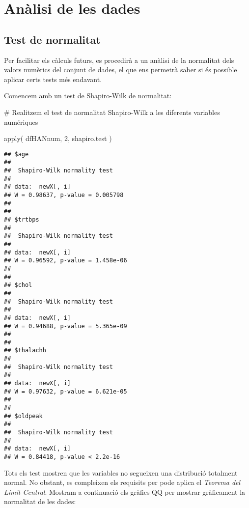 \documentclass[
]{article}
\newenvironment{Shaded}{\begin{snugshade}}{\end{snugshade}}
\newcommand{\CommentTok}[1]{\textcolor[rgb]{0.50,0.62,0.50}{#1}}
\newcommand{\DecValTok}[1]{\textcolor[rgb]{0.86,0.86,0.80}{#1}}
\newcommand{\FunctionTok}[1]{\textcolor[rgb]{0.94,0.94,0.56}{#1}}
\newcommand{\NormalTok}[1]{\textcolor[rgb]{0.80,0.80,0.80}{#1}}
\begin{document}
\hypertarget{anuxe0lisi-de-les-dades}{%
\section{Anàlisi de les dades}\label{anuxe0lisi-de-les-dades}}

\hypertarget{test-de-normalitat}{%
\subsection{Test de normalitat}\label{test-de-normalitat}}

Per facilitar els càlculs futurs, es procedirà a un anàlisi de la
normalitat dels valors numèrics del conjunt de dades, el que ens
permetrà saber si és possible aplicar certs tests més endavant.

Comencem amb un test de Shapiro-Wilk de normalitat:

\begin{Shaded}
\begin{Highlighting}[]
\CommentTok{\# Realitzem el test de normalitat Shapiro{-}Wilk a les diferents variables numériques}

\FunctionTok{apply}\NormalTok{( dfHANnum, }\DecValTok{2}\NormalTok{, shapiro.test )}
\end{Highlighting}
\end{Shaded}

\begin{verbatim}
## $age
## 
##  Shapiro-Wilk normality test
## 
## data:  newX[, i]
## W = 0.98637, p-value = 0.005798
## 
## 
## $trtbps
## 
##  Shapiro-Wilk normality test
## 
## data:  newX[, i]
## W = 0.96592, p-value = 1.458e-06
## 
## 
## $chol
## 
##  Shapiro-Wilk normality test
## 
## data:  newX[, i]
## W = 0.94688, p-value = 5.365e-09
## 
## 
## $thalachh
## 
##  Shapiro-Wilk normality test
## 
## data:  newX[, i]
## W = 0.97632, p-value = 6.621e-05
## 
## 
## $oldpeak
## 
##  Shapiro-Wilk normality test
## 
## data:  newX[, i]
## W = 0.84418, p-value < 2.2e-16
\end{verbatim}

Tots els test mostren que les variables no segueixen una distribució
totalment normal. No obstant, es compleixen els requisits per pode
aplica el \emph{Teorema del Límit Central}. Mostram a continuació els
gràfics QQ per mostrar gràficament la normalitat de les dades:
\end{document}
